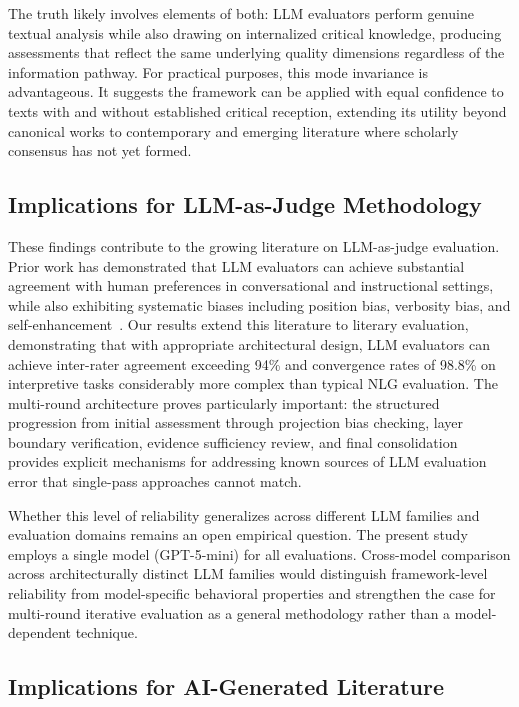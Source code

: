 The truth likely involves elements of both: LLM evaluators perform genuine textual analysis while also drawing on internalized critical knowledge, producing assessments that reflect the same underlying quality dimensions regardless of the information pathway. For practical purposes, this mode invariance is advantageous. It suggests the framework can be applied with equal confidence to texts with and without established critical reception, extending its utility beyond canonical works to contemporary and emerging literature where scholarly consensus has not yet formed.

\subsection{Implications for LLM-as-Judge Methodology}

These findings contribute to the growing literature on LLM-as-judge evaluation. Prior work has demonstrated that LLM evaluators can achieve substantial agreement with human preferences in conversational and instructional settings, while also exhibiting systematic biases including position bias, verbosity bias, and self-enhancement~\cite{zheng2023judging,li2024llms}. Our results extend this literature to literary evaluation, demonstrating that with appropriate architectural design, LLM evaluators can achieve inter-rater agreement exceeding 94\% and convergence rates of 98.8\% on interpretive tasks considerably more complex than typical NLG evaluation. The multi-round architecture proves particularly important: the structured progression from initial assessment through projection bias checking, layer boundary verification, evidence sufficiency review, and final consolidation provides explicit mechanisms for addressing known sources of LLM evaluation error that single-pass approaches cannot match.

Whether this level of reliability generalizes across different LLM families and evaluation domains remains an open empirical question. The present study employs a single model (GPT-5-mini) for all evaluations. Cross-model comparison across architecturally distinct LLM families would distinguish framework-level reliability from model-specific behavioral properties and strengthen the case for multi-round iterative evaluation as a general methodology rather than a model-dependent technique.

\subsection{Implications for AI-Generated Literature}

